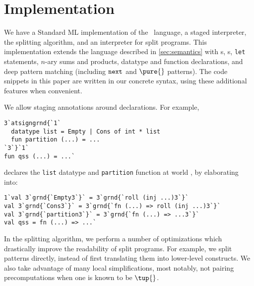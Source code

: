 
\section {Implementation}
\label{sec:implementation}

\begin{abstrsyn}
We have a Standard ML implementation of the \lang\ language, a staged
interpreter, the splitting algorithm, and an interpreter for split programs.
This implementation extends the language described in \ref{sec:semantics} with 
\rmint{}s,
\rmbool{}s,
\texttt{let} statements,
$n$-ary sums and products,
datatype and function declarations, and
deep pattern matching (including ${\tt next}{}$ and $\pure{}$ patterns).
The code snippets in this paper are written in our concrete syntax, using 
these additional features when convenient.

We allow staging annotations around declarations. For example,
\begin{lstlisting}
3`atsigngrnd{`1`
  datatype list = Empty | Cons of int * list
  fun partition (...) = ...
`3`}`1`
fun qss (...) = ...`
\end{lstlisting}
declares the \texttt{list} datatype and \texttt{partition} function at world \bbonep,
by elaborating into:
\begin{lstlisting}
1`val 3`grnd{`Empty3`}` = 3`grnd{`roll (inj ...)3`}`
val 3`grnd{`Cons3`}` = 3`grnd{`fn (...) => roll (inj ...)3`}`
val 3`grnd{`partition3`}` = 3`grnd{`fn (...) => ...3`}`
val qss = fn (...) => ...`
\end{lstlisting}

In the splitting algorithm, we perform a number of optimizations which
drastically improve the readability of split programs. For example, we split
patterns directly, instead of first translating them into lower-level
constructs. We also take advantage of many local simplifications, most notably,
not pairing precomputations when one is known to be $\tup{}$.




\end{abstrsyn}
